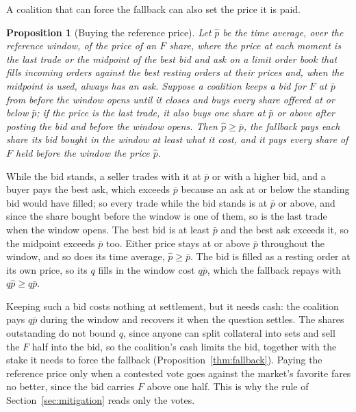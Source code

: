 \documentclass[conference,compsoc]{IEEEtran}
\newtheorem{proposition}{Proposition}
\newcommand{\phat}{\hat{p}}
\begin{document}
A coalition that can force the fallback can also set the price it is paid.

\begin{proposition}[Buying the reference price]
\label{prop:selffin}
 Let $\phat$ be the time average, over the reference window, of the price of an $F$ share, where the price at each moment is the last trade or the midpoint of the best bid and ask on a limit order book that fills incoming orders against the best resting orders at their prices and, when the midpoint is used, always has an ask. Suppose a coalition keeps a bid for $F$ at $\bar p$ from before the window opens until it closes and buys every share offered at or below $\bar p$; if the price is the last trade, it also buys one share at $\bar p$ or above after posting the bid and before the window opens. Then $\phat \ge \bar p$, the fallback pays each share its bid bought in the window at least what it cost, and it pays every share of $F$ held before the window the price $\phat$.
\end{proposition}
\begin{IEEEproof}
 While the bid stands, a seller trades with it at $\bar p$ or with a higher bid, and a buyer pays the best ask, which exceeds $\bar p$ because an ask at or below the standing bid would have filled; so every trade while the bid stands is at $\bar p$ or above, and since the share bought before the window is one of them, so is the last trade when the window opens. The best bid is at least $\bar p$ and the best ask exceeds it, so the midpoint exceeds $\bar p$ too. Either price stays at or above $\bar p$ throughout the window, and so does its time average, $\phat \ge \bar p$. The bid is filled as a resting order at its own price, so its $q$ fills in the window cost $q\bar p$, which the fallback repays with $q\phat \ge q\bar p$.
\end{IEEEproof}
 Keeping such a bid costs nothing at settlement, but it needs cash: the coalition pays $q\bar p$ during the window and recovers it when the question settles. The shares outstanding do not bound $q$, since anyone can split collateral into sets and sell the $F$ half into the bid, so the coalition's cash limits the bid, together with the stake it needs to force the fallback (Proposition~\ref{thm:fallback}). Paying the reference price only when a contested vote goes against the market's favorite fares no better, since the bid carries $F$ above one half. This is why the rule of Section~\ref{sec:mitigation} reads only the votes.
\end{document}
